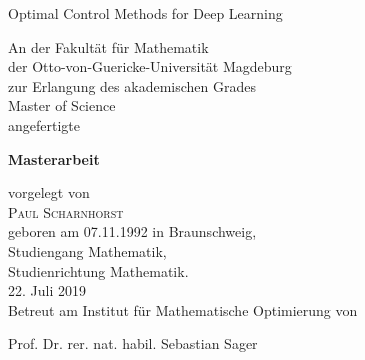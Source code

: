 
%
%
%

\begin{center}
\vspace*{1,5cm}
\begin{Large}
\doublespacing
\begin{scshape}
Optimal Control Methods for Deep Learning
\end{scshape}
\singlespacing
\end{Large}
\vspace{\fill}
An der Fakultät für Mathematik\\
der Otto-von-Guericke-Universität Magdeburg\\
zur Erlangung des akademischen Grades \\
Master of Science
\\
angefertigte\\
\vspace{\fill}
\begin{Large}
\textbf{Masterarbeit} 
\\
\end{Large}
\vspace{\fill}

vorgelegt von\\
\textsc{Paul Scharnhorst}\\
geboren am 07.11.1992 in Braunschweig,\\
Studiengang Mathematik,\\
Studienrichtung Mathematik.\\[2ex]
22. Juli 2019\\
\vspace{\fill}
Betreut am Institut für
Mathematische Optimierung
von\\
\begin{scshape}
Prof. Dr. rer. nat. habil. Sebastian Sager
\end{scshape}
\end{center}



%
\thispagestyle{empty}
